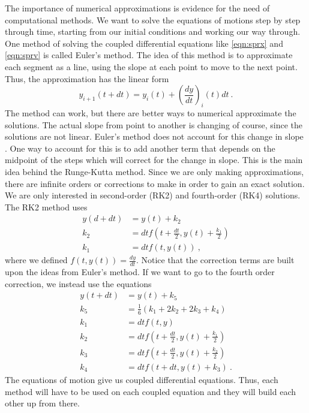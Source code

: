 \documentclass[aps,prl,twocolumn,superscriptaddress]{revtex4-1}
\newcommand{\paren}[1]{\left( #1 \right)} 	%
\begin{document}
The importance of numerical approximations is evidence for the need of computational methods. We want to solve the equations of motions step by step through time, starting from our initial conditions and working our way through. One method of solving the coupled differential equations like \ref{eqn:sprx} and \ref{eqn:sprv} is called Euler's method. The idea of this method is to approximate each segment as a line, using the slope at each point to move to the next point. Thus, the approximation has the linear form \cite{Euler}
\begin{equation}
y_{i+1}(t+dt) = y_i(t) + \paren{\frac{dy}{dt}}_i (t) dt ~. \label{eqn:euler}
\end{equation}
The method can work, but there are better ways to numerical approximate the solutions. The actual slope from point to another is changing of course, since the solutions are not linear. Euler's method does not account for this change in slope \cite{Laulima}. One way to account for this is to add another term that depends on the midpoint of the steps which will correct for the change in slope. This is the main idea behind the Runge-Kutta method. Since we are only making approximations, there are infinite orders or corrections to make in order to gain an exact solution. We are only interested in second-order (RK2) and fourth-order (RK4) solutions. The RK2 method uses
\begin{align}
y(d+dt) &= y(t) + k_2 \label{eqn:rk2main} \\
k_2 &= dt f( t+\frac{dt}{2}, y(t)+\frac{k_1}{2}) \label{eqn:rk2k2} \\
k_1 &= dt f(t, y(t)) \label{eqn:rk2k1} ~,
\end{align}
where we defined $f(t, y(t)) = \frac{dy}{dt}$. Notice that the correction terms are built upon the ideas from Euler's method.
If we want to go to the fourth order correction, we instead use the equations
\begin{align}
y(t+dt) &= y(t) + k_5 \\
k_5 &= \frac{1}{6} (k_1 + 2k_2 + 2k_3 + k_4) \\
k_1 &= dt f(t, y) \\
k_2 &= dt f( t+\frac{dt}{2}, y(t)+\frac{k_1}{2}) \\
k_3 &= dt f( t+\frac{dt}{2}, y(t)+\frac{k_2}{2}) \\
k_4 &= dt f( t+dt, y(t)+k_3 ) ~.
\end{align}
The equations of motion give us coupled differential equations. Thus, each method will have to be used on each coupled equation and they will build each other up from there.
\end{document}
